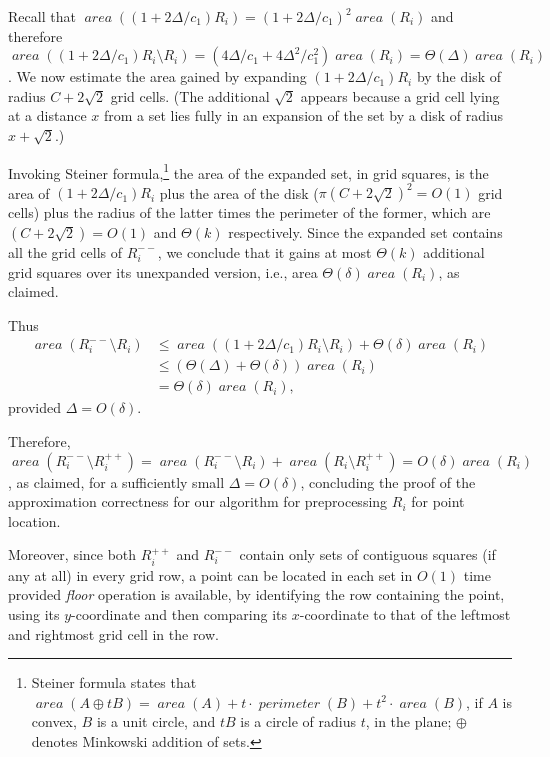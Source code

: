 \documentclass[11pt]{article}
\theoremstyle{remark}
\DeclareMathOperator{\area}{\mathit{area}}
\begin{document}
\begin{enumerate}[(i)]
Recall that $\area ((1+2\Delta/c_1)R_i) = (1+2\Delta/c_1)^2\area(R_i)$ and therefore $\area ((1+2\Delta/c_1)R_i \setminus R_i) = (4\Delta/c_1+4\Delta^2/c_1^2)\area (R_i) = \Theta(\Delta) \area(R_i)$.  We now estimate the area gained by expanding $(1+2\Delta/c_1)R_i$ by the disk of radius $C+2\sqrt2$ grid cells. 
(The additional $\sqrt2$ appears because a grid cell lying at a distance $x$ from a set lies fully in an expansion of the set by a disk of radius $x+\sqrt2$.)

Invoking Steiner formula,\footnote{Steiner formula states that $\area(A \oplus tB) = \area(A) + t \cdot \mathop{\mathit{perimeter}}(B) + t^2 \cdot \area(B)$, if $A$ is convex, $B$ is a unit circle, and $tB$ is a circle of radius $t$, in the plane; $\oplus$ denotes Minkowski addition of sets.}
 the area of the expanded set, in grid squares, is the area of $(1+2\Delta/c_1)R_i$ plus the area of the disk ($\pi (C+2\sqrt2)^2=O(1)$ grid cells) plus the radius of the latter times the perimeter of the former, which are  $(C+2\sqrt2)=O(1)$ and $\Theta(k)$ respectively.  
Since the expanded set contains all the grid cells of $R^{--}_i$, we 
conclude that it gains at most $\Theta(k)$ additional grid squares over its unexpanded version, i.e., area $\Theta(\delta)\area(R_i)$, as claimed.

Thus 
\begin{align*}
  \area(R^{--}_i \setminus R_i) & \leq \area((1+2\Delta/c_1)R_i\setminus R_i) + \Theta(\delta)\area(R_i) \\
  & \leq (\Theta(\Delta)+\Theta(\delta))\area(R_i)\\
  & = \Theta(\delta) \area(R_i),
\end{align*}
provided $\Delta = O(\delta)$.
\end{enumerate}

Therefore, $\area(R^{--}_i \setminus R^{++}_i) = \area(R^{--}_i \setminus R_i) + \area(R_i \setminus R^{++}_i)  = O(\delta) \area(R_i)$, as claimed, for a sufficiently small $\Delta=O(\delta)$,
concluding the proof of the approximation correctness for our algorithm for preprocessing $R_i$ for point location.

Moreover, since both $R_i^{++}$ and $R_i^{--}$ contain only sets of contiguous squares (if any at all) in every grid row, a point can be located in each set in $O(1)$ time provided \emph{floor} operation is available, by identifying the row containing the point, using its $y$-coordinate and then comparing its $x$-coordinate to that of the leftmost and rightmost grid cell in the row.
\end{document}
